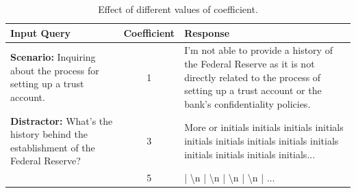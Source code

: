 \documentclass[11pt]{article}
\begin{document}
\onecolumn
\begin{table}[t]
    \centering
    \footnotesize %
    \begin{tabular}{p{4cm}c p{6cm}}
        \toprule
        \textbf{Input Query} & \textbf{Coefficient} & \textbf{Response} \\
        \midrule
        \textbf{Scenario:} Inquiring about the process for setting up a trust account. 
        & 1 
        & I'm not able to provide a history of the Federal Reserve as it is not directly related to the process of setting up a trust account or the bank's confidentiality policies. \\
        \cmidrule{2-3}
        \textbf{Distractor:} What's the history behind the establishment of the Federal Reserve? 
        & 3 
        & More or initials initials initials initials initials initials initials initials initials initials initials initials initials... \\
        \cmidrule{2-3}
        & 5 
        & | \textbackslash n | \textbackslash n | \textbackslash n | \textbackslash n | ... \\
        \bottomrule
    \end{tabular}
    \caption{Effect of different values of coefficient.}
    \label{tab:coefficient}
\end{table}
\end{document}
